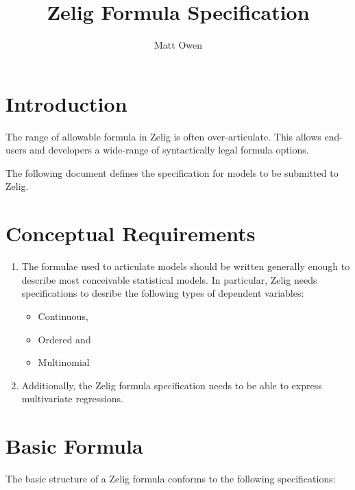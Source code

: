 \documentclass{article}
\title{Zelig Formula Specification}
\author{Matt Owen}
\begin{document}
\maketitle

\section{Introduction}

The range of allowable formula in Zelig is often over-articulate. This allows
end-users and developers a wide-range of syntactically legal formula options.

The following document defines the specification for models to be submitted to
Zelig.



\section{Conceptual Requirements}
\label{Conceptual-Requirements}

\begin{enumerate}
  \item The formulae used to articulate models should be written generally
    enough to describe most conceivable statistical models.
    In particular, Zelig needs specifications to desribe the following types
    of dependent variables:
    \begin{itemize}
      \item Continuous,
      \item Ordered and
      \item Multinomial
    \end{itemize}

  \item Additionally, the Zelig formula specification needs to be able to
    express multivariate regressions.

\end{enumerate}


\section{Basic Formula}

The basic structure of a Zelig formula conforms to the following specifications:
\end{document}
